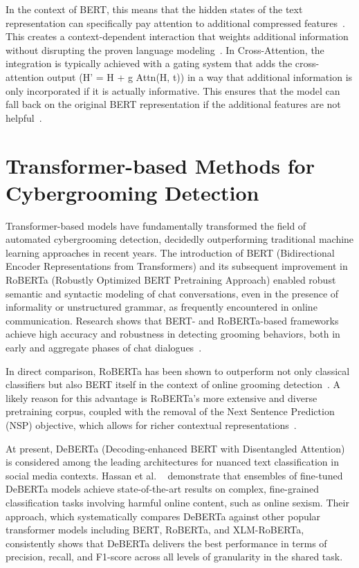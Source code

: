 In the context of BERT, this means that the hidden states of the text representation can specifically pay attention to additional compressed features~\parencite{biggiogera2021,cai2025multimodal}. This creates a context-dependent interaction that weights additional information without disrupting the proven language modeling~\parencite{cai2025multimodal}.    
In Cross-Attention, the integration is typically achieved with a gating system that adds the cross-attention output (H' = H + g \odot Attn(H, t)) in a way that additional information is only incorporated if it is actually informative. This ensures that the model can fall back on the original BERT representation if the additional features are not helpful~\parencite{cai2025multimodal}.






\section{Transformer-based Methods for Cybergrooming Detection}


Transformer-based models have fundamentally transformed the field of automated cybergrooming detection, decidedly outperforming traditional machine learning approaches in recent years. The introduction of BERT (Bidirectional Encoder Representations from Transformers) and its subsequent improvement in RoBERTa (Robustly Optimized BERT Pretraining Approach) enabled robust semantic and syntactic modeling of chat conversations, even in the presence of informality or unstructured grammar, as frequently encountered in online communication. Research shows that BERT- and RoBERTa-based frameworks achieve high accuracy and robustness in detecting grooming behaviors, both in early and aggregate phases of chat dialogues~\parencite{vogt2021early}. 

In direct comparison, RoBERTa has been shown to outperform not only classical classifiers but also BERT itself in the context of online grooming detection~\parencite{street2024grooming}. A likely reason for this advantage is RoBERTa’s more extensive and diverse pretraining corpus, coupled with the removal of the Next Sentence Prediction (NSP) objective, which allows for richer contextual representations~\parencite{liu2019roberta}. %

At present, DeBERTa (Decoding-enhanced BERT with Disentangled Attention) is considered among the leading architectures for nuanced text classification in social media contexts. Hassan et al. ~\parencite{hassan2023fircatsemeval} demonstrate that ensembles of fine-tuned DeBERTa models achieve state-of-the-art results on complex, fine-grained classification tasks involving harmful online content, such as online sexism. Their approach, which systematically compares DeBERTa against other popular transformer models including BERT, RoBERTa, and XLM-RoBERTa, consistently shows that DeBERTa delivers the best performance in terms of precision, recall, and F1-score across all levels of granularity in the shared task. %

